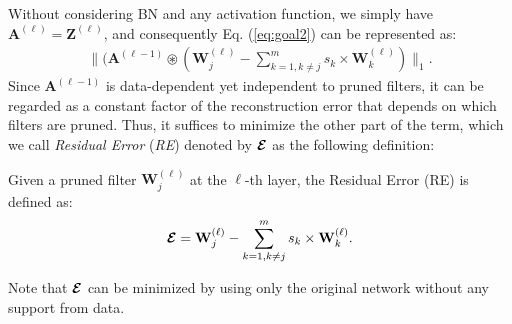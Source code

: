 Without considering BN and any activation function, we simply have $\mathbf{A}^{(\ell)} = \mathbf{Z}^{(\ell)}$, and consequently Eq. (\ref{eq:goal2}) can be represented as:
\begin{gather*}
     \| (\mathbf{A}^{(\ell-1)}  \circledast (\mathbf{W}_{j}^{(\ell)} - \sum\limits_{k = 1, k \neq j }^{m} {s}_{k} \times \mathbf{W}_{k}^{(\ell)} ) \|_{1}.
\end{gather*}
Since $\mathbf{A}^{(\ell-1)}$ is data-dependent yet independent to pruned filters, it can be regarded as a constant factor of the reconstruction error that depends on which filters are pruned. Thus, it suffices to minimize the other part of the term, which we call \textit{Residual Error} (\textit{RE}) denoted by $\boldsymbol{\mathcal{E}}$ as the following definition:
\begin{definition} \label{def:re}
Given a pruned filter $\mathbf{W}_{j}^{(\ell)}$ at the $\ell$-th layer, the Residual Error (RE) is defined as:
$$
\boldsymbol{\mathcal{E}} = \mathbf{W}_{j}^{(\ell)} - \sum\limits_{k = 1, k \neq j }^{m} {s}_{k} \times \mathbf{W}_{k}^{(\ell)}.
$$
\end{definition}
Note that $\boldsymbol{\mathcal{E}}$ can be minimized by using only the original network without any support from data.



